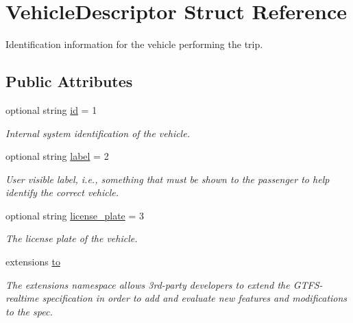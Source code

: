 \hypertarget{structVehicleDescriptor}{}\section{Vehicle\+Descriptor Struct Reference}
\label{structVehicleDescriptor}


Identification information for the vehicle performing the trip.  


\subsection*{Public Attributes}
\begin{DoxyCompactItemize}
\item 
optional string \hyperlink{structVehicleDescriptor_af0b178595e9bbda85167bb49dfc4bb6b}{id} = 1
\begin{DoxyCompactList}\small\item\em Internal system identification of the vehicle. \end{DoxyCompactList}\item 
optional string \hyperlink{structVehicleDescriptor_a9007e0bbc4c086cd2a33aa15cd642829}{label} = 2
\begin{DoxyCompactList}\small\item\em User visible label, i.\+e., something that must be shown to the passenger to help identify the correct vehicle. \end{DoxyCompactList}\item 
optional string \hyperlink{structVehicleDescriptor_a8a4f04cdb49b96b3feab31561defa1db}{license\+\_\+plate} = 3\hypertarget{structVehicleDescriptor_a8a4f04cdb49b96b3feab31561defa1db}{}\label{structVehicleDescriptor_a8a4f04cdb49b96b3feab31561defa1db}

\begin{DoxyCompactList}\small\item\em The license plate of the vehicle. \end{DoxyCompactList}\item 
extensions \hyperlink{structVehicleDescriptor_a63dfb9a9be55a2ad46061bc66bed4b15}{to}
\begin{DoxyCompactList}\small\item\em The extensions namespace allows 3rd-\/party developers to extend the G\+T\+F\+S-\/realtime specification in order to add and evaluate new features and modifications to the spec. \end{DoxyCompactList}\end{DoxyCompactItemize}


